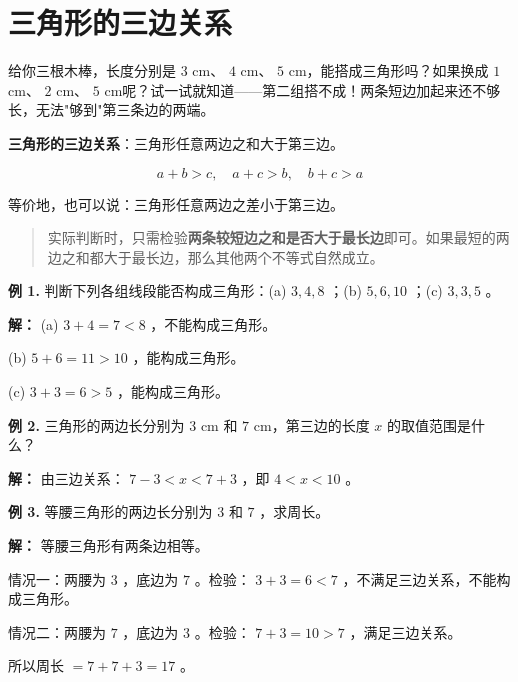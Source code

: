 \section*{三角形的三边关系}


\begin{explore}


给你三根木棒，长度分别是 $3$ cm、 $4$ cm、 $5$ cm，能搭成三角形吗？如果换成 $1$ cm、 $2$ cm、 $5$ cm呢？试一试就知道——第二组搭不成！两条短边加起来还不够长，无法"够到"第三条边的两端。

\end{explore}

\begin{understand}


\textbf{三角形的三边关系}：三角形任意两边之和大于第三边。

\[
a + b > c, \quad a + c > b, \quad b + c > a
\]


等价地，也可以说：三角形任意两边之差小于第三边。

\end{understand}

\begin{quote}
实际判断时，只需检验\textbf{两条较短边之和是否大于最长边}即可。如果最短的两边之和都大于最长边，那么其他两个不等式自然成立。
\end{quote}


\begin{workedexamples}


\textbf{例 1.} 判断下列各组线段能否构成三角形：(a) $3, 4, 8$ ；(b) $5, 6, 10$ ；(c) $3, 3, 5$ 。

\textbf{解：}
(a) $3 + 4 = 7 < 8$ ，不能构成三角形。

(b) $5 + 6 = 11 > 10$ ，能构成三角形。

(c) $3 + 3 = 6 > 5$ ，能构成三角形。

\textbf{例 2.} 三角形的两边长分别为 $3$ cm 和 $7$ cm，第三边的长度 $x$ 的取值范围是什么？

\textbf{解：}
由三边关系： $7 - 3 < x < 7 + 3$ ，即 $4 < x < 10$ 。

\textbf{例 3.} 等腰三角形的两边长分别为 $3$ 和 $7$ ，求周长。

\textbf{解：}
等腰三角形有两条边相等。

情况一：两腰为 $3$ ，底边为 $7$ 。检验： $3 + 3 = 6 < 7$ ，不满足三边关系，不能构成三角形。

情况二：两腰为 $7$ ，底边为 $3$ 。检验： $7 + 3 = 10 > 7$ ，满足三边关系。

所以周长 $= 7 + 7 + 3 = 17$ 。

\end{workedexamples}

